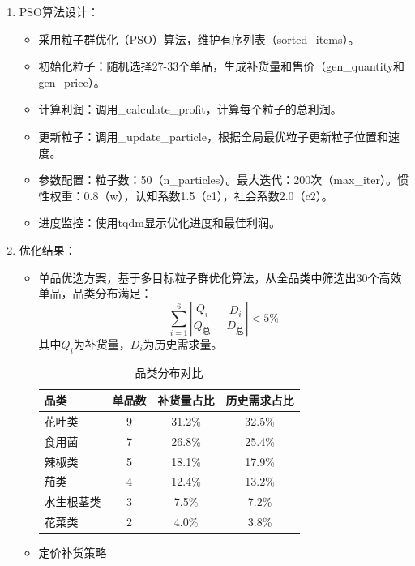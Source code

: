 \documentclass{cumcmthesis} %
\begin{document}
\begin{enumerate}
    \item PSO算法设计：
    \begin{itemize}
        \item 采用粒子群优化（PSO）算法，维护有序列表（sorted\_items）。
        \item 初始化粒子：随机选择27-33个单品，生成补货量和售价（gen\_quantity和gen\_price）。
        \item 计算利润：调用\_calculate\_profit，计算每个粒子的总利润。
        \item 更新粒子：调用\_update\_particle，根据全局最优粒子更新粒子位置和速度。
        \item 参数配置：粒子数：50（n\_particles）。最大迭代：200次（max\_iter）。惯性权重：0.8（w），认知系数1.5（c1），社会系数2.0（c2）。
        \item 进度监控：使用tqdm显示优化进度和最佳利润。
    \end{itemize}
    \item 优化结果：
    \begin{itemize}
        \item 单品优选方案，基于多目标粒子群优化算法，从全品类中筛选出30个高效单品，品类分布满足：
        $$\sum_{i=1}^{6}\left|\frac{Q_{i}}{Q_{\text{总}}}-\frac{D_{i}}{D_{\text{总}}}\right|<5\%$$
        其中$Q_{i}$为补货量，$D_{i}$为历史需求量。

        \begin{table}[htbp]
            \centering
            \caption{品类分布对比}
            \label{tab:category}
            \begin{tabular}{lccc}
            \toprule
            品类 & 单品数 & 补货量占比 & 历史需求占比 \\
            \midrule
            花叶类 & 9 & 31.2\% & 32.5\% \\
            食用菌 & 7 & 26.8\% & 25.4\% \\
            辣椒类 & 5 & 18.1\% & 17.9\% \\
            茄类 & 4 & 12.4\% & 13.2\% \\
            水生根茎类 & 3 & 7.5\% & 7.2\% \\
            花菜类 & 2 & 4.0\% & 3.8\% \\
            \bottomrule
            \end{tabular}
            \end{table}

        \item 定价补货策略
        

\end{itemize}
\end{enumerate}
\end{document}
